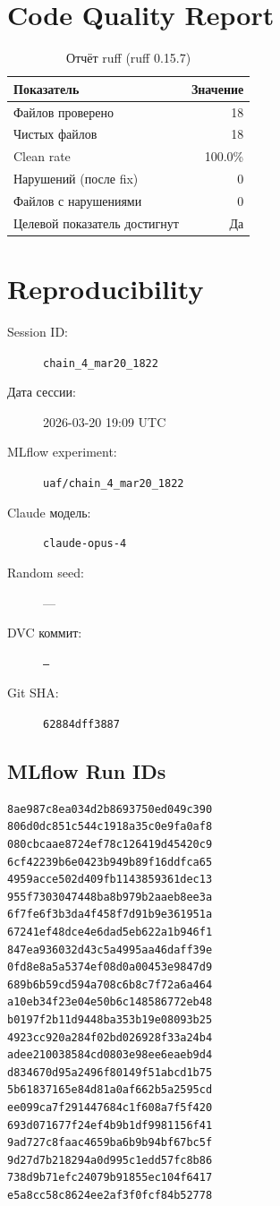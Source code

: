 \documentclass[12pt,a4paper]{article}
\begin{document}
\section{Code Quality Report}

\begin{table}[H]
\centering
\caption{Отчёт ruff (ruff 0.15.7)}
\begin{tabular}{lr}
\toprule
Показатель & Значение \\
\midrule
Файлов проверено & 18 \\
Чистых файлов & 18 \\
Clean rate & \textcolor{passcolor}{100.0\%} \\
Нарушений (после fix) & \textcolor{passcolor}{0} \\
Файлов с нарушениями & 0 \\
Целевой показатель достигнут & \textcolor{passcolor}{Да} \\
\bottomrule
\end{tabular}
\end{table}





\section{Reproducibility}

\begin{description}
    \item[Session ID:] \texttt{chain\_4\_mar20\_1822}
    \item[Дата сессии:] 2026-03-20 19:09 UTC
    \item[MLflow experiment:] \texttt{uaf/chain\_4\_mar20\_1822}
    \item[Claude модель:] \texttt{claude-opus-4}
    \item[Random seed:] ---
    \item[DVC коммит:] \texttt{---}
    \item[Git SHA:] \texttt{62884dff3887}
\end{description}

\subsection*{MLflow Run IDs}

\begin{lstlisting}
8ae987c8ea034d2b8693750ed049c390
806d0dc851c544c1918a35c0e9fa0af8
080cbcaae8724ef78c126419d45420c9
6cf42239b6e0423b949b89f16ddfca65
4959acce502d409fb1143859361dec13
955f7303047448ba8b979b2aaeb8ee3a
6f7fe6f3b3da4f458f7d91b9e361951a
67241ef48dce4e6dad5eb622a1b946f1
847ea936032d43c5a4995aa46daff39e
0fd8e8a5a5374ef08d0a00453e9847d9
689b6b59cd594a708c6b8c7f72a6a464
a10eb34f23e04e50b6c148586772eb48
b0197f2b11d9448ba353b19e08093b25
4923cc920a284f02bd026928f33a24b4
adee210038584cd0803e98ee6eaeb9d4
d834670d95a2496f80149f51abcd1b75
5b61837165e84d81a0af662b5a2595cd
ee099ca7f291447684c1f608a7f5f420
693d071677f24ef4b9b1df9981156f41
9ad727c8faac4659ba6b9b94bf67bc5f
9d27d7b218294a0d995c1edd57fc8b86
738d9b71efc24079b91855ec104f6417
e5a8cc58c8624ee2af3f0fcf84b52778
\end{lstlisting}
\end{document}
